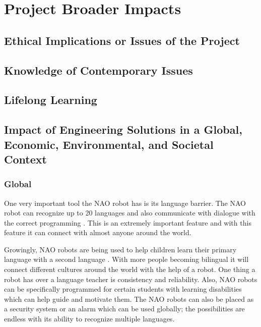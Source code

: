 \chapter{Project Broader Impacts}
\label{ch:projectbroaderimpacts}

\section{Ethical Implications or Issues of the Project}
\section{Knowledge of Contemporary Issues}
\section{Lifelong Learning}


\newpage
\section{Impact of Engineering Solutions in a Global, Economic, Environmental, and Societal Context}
\subsection{Global}
One very important tool the NAO robot has is its language barrier. The NAO robot can recognize up to 20 languages and also communicate with dialogue with the correct programming \cite{softbank}. This is an extremely important feature and with this feature it can connect with almost anyone around the world.\par

Growingly, NAO robots are being used to help children learn their primary language with a second language \cite{hodson_2015}. With more people becoming bilingual it will connect different cultures around the world with the help of a robot. One thing a robot has over a language teacher is consistency and reliability. Also, NAO robots can be specifically programmed for certain students with learning disabilities which can help guide and motivate them. The NAO robots can also be placed as a security system or an alarm which can be used globally; the possibilities are endless with its ability to recognize multiple languages. \par

